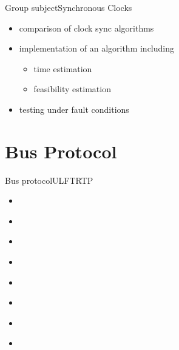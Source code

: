 \documentclass{beamer}
\begin{document}
\begin{frame}{Group subject}{Synchronous Clocks}
  \begin{itemize}
    \item \begin{large}comparison of clock sync algorithms\end{large}
    \item \begin{large}implementation of an algorithm including\end{large}
      \begin{itemize}
	\item time estimation
	\item feasibility estimation
      \end{itemize}
    \item \begin{large}testing under fault conditions\end{large}
  \end{itemize}
\end{frame}

\section{Bus Protocol}
\begin{frame}{Bus protocol}{ULFTRTP}
\begin{center}
\begin{itemize}
  \item \begin{large}\end{large}
 \item \begin{large}\end{large}
 \item \begin{large}\end{large}
 \item \begin{large}\end{large}
\end{itemize}
\end{center}
\end{frame}

\begin{frame}{}%
\begin{center}
\begin{itemize}
  \item \begin{large}\end{large}
 \item \begin{large}\end{large}
 \item \begin{large}\end{large}
 \item \begin{large}\end{large}
\end{itemize}
\end{center}
\end{frame}
\end{document}
